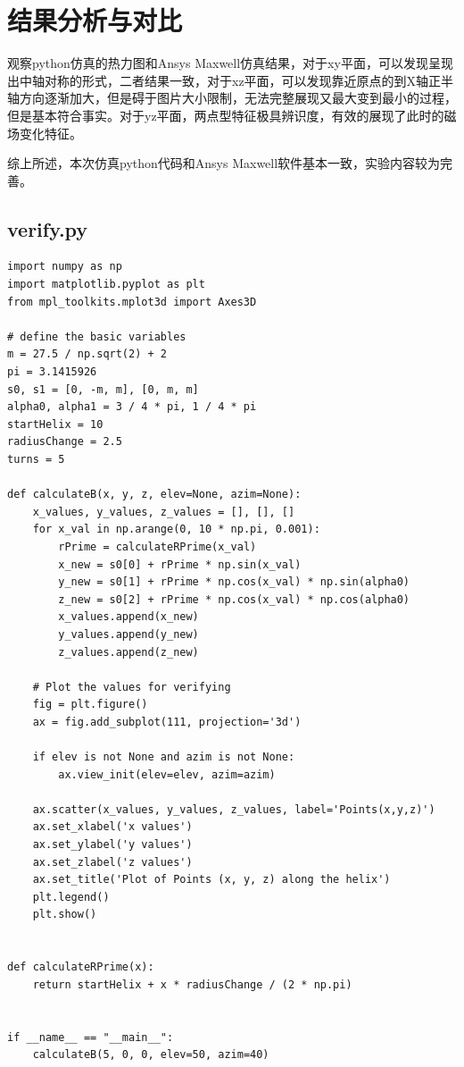 \documentclass{article}
\begin{document}
\section{结果分析与对比}
观察python仿真的热力图和Ansys Maxwell仿真结果，对于xy平面，可以发现呈现出中轴对称的形式，二者结果一致，对于xz平面，可以发现靠近原点的到X轴正半轴方向逐渐加大，但是碍于图片大小限制，无法完整展现又最大变到最小的过程，但是基本符合事实。对于yz平面，两点型特征极具辨识度，有效的展现了此时的磁场变化特征。

综上所述，本次仿真python代码和Ansys Maxwell软件基本一致，实验内容较为完善。

\begin{appendices}
    \renewcommand{\thesection}{\Alph{section}}
    \section{verify.py}

    \begin{lstlisting}
import numpy as np
import matplotlib.pyplot as plt
from mpl_toolkits.mplot3d import Axes3D

# define the basic variables
m = 27.5 / np.sqrt(2) + 2
pi = 3.1415926
s0, s1 = [0, -m, m], [0, m, m]
alpha0, alpha1 = 3 / 4 * pi, 1 / 4 * pi
startHelix = 10
radiusChange = 2.5
turns = 5

def calculateB(x, y, z, elev=None, azim=None):
    x_values, y_values, z_values = [], [], []
    for x_val in np.arange(0, 10 * np.pi, 0.001):
        rPrime = calculateRPrime(x_val)
        x_new = s0[0] + rPrime * np.sin(x_val)
        y_new = s0[1] + rPrime * np.cos(x_val) * np.sin(alpha0)
        z_new = s0[2] + rPrime * np.cos(x_val) * np.cos(alpha0)
        x_values.append(x_new)
        y_values.append(y_new)
        z_values.append(z_new)

    # Plot the values for verifying
    fig = plt.figure()
    ax = fig.add_subplot(111, projection='3d')

    if elev is not None and azim is not None:
        ax.view_init(elev=elev, azim=azim)

    ax.scatter(x_values, y_values, z_values, label='Points(x,y,z)')
    ax.set_xlabel('x values')
    ax.set_ylabel('y values')
    ax.set_zlabel('z values')
    ax.set_title('Plot of Points (x, y, z) along the helix')
    plt.legend()
    plt.show()


def calculateRPrime(x):
    return startHelix + x * radiusChange / (2 * np.pi)


if __name__ == "__main__":
    calculateB(5, 0, 0, elev=50, azim=40) 
    \end{lstlisting}



\end{appendices}
\end{document}
